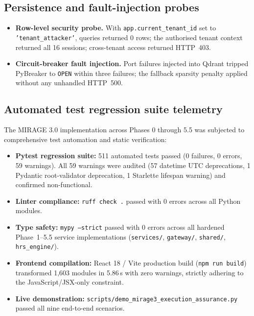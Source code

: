 \documentclass[11pt,a4paper]{article}
\newcommand{\fp}[1]{\texttt{\scriptsize #1}}
\begin{document}
\subsection{Persistence and fault-injection probes}
\begin{itemize}[leftmargin=*,itemsep=1pt]
  \item \textbf{Row-level security probe.} With \texttt{app.current\_tenant\_id} set to \texttt{'tenant\_attacker'}, queries returned 0 rows; the authorised tenant context returned all 16 sessions; cross-tenant access returned HTTP~403.
  \item \textbf{Circuit-breaker fault injection.} Port failures injected into Qdrant tripped PyBreaker to \texttt{OPEN} within three failures; the fallback sparsity penalty applied without any unhandled HTTP~500.
\end{itemize}

\subsection{Automated test regression suite telemetry}
The MIRAGE 3.0 implementation across Phases 0 through 5.5 was subjected to comprehensive test automation and static verification:
\begin{itemize}[leftmargin=*,itemsep=1pt]
  \item \textbf{Pytest regression suite:} 511 automated tests passed (0 failures, 0 errors, 59 warnings). All 59 warnings were audited (57 datetime UTC deprecations, 1 Pydantic root-validator deprecation, 1 Starlette lifespan warning) and confirmed non-functional.
  \item \textbf{Linter compliance:} \texttt{ruff check .} passed with 0 errors across all Python modules.
  \item \textbf{Type safety:} \texttt{mypy --strict} passed with 0 errors across all hardened Phase~1--5.5 service implementations (\fp{services/}, \fp{gateway/}, \fp{shared/}, \fp{hrs\_engine/}).
  \item \textbf{Frontend compilation:} React 18 / Vite production build (\fp{npm run build}) transformed 1,603 modules in 5.86\,s with zero warnings, strictly adhering to the JavaScript/JSX-only constraint.
  \item \textbf{Live demonstration:} \fp{scripts/demo\_mirage3\_execution\_assurance.py} passed all nine end-to-end scenarios.
\end{itemize}

\end{document}
